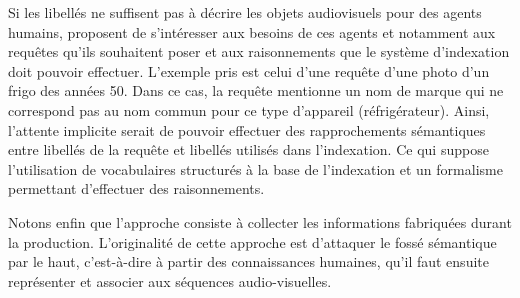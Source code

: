 Si les libellés ne suffisent pas à décrire les objets audiovisuels pour des agents humains, \citeauthor{hare:semantic-gap} proposent de s'intéresser aux besoins de ces agents et notamment aux requêtes qu'ils souhaitent poser et aux raisonnements que le système d'indexation doit pouvoir effectuer. 
L'exemple pris est celui d'une requête d'une photo d'un frigo des années 50. 
Dans ce cas, la requête mentionne un nom de marque qui ne correspond pas au nom commun pour ce type d'appareil (réfrigérateur). 
Ainsi, l'attente implicite serait de pouvoir effectuer des rapprochements sémantiques entre libellés de la requête et libellés utilisés dans l'indexation. 
Ce qui suppose l'utilisation de vocabulaires structurés à la base de l'indexation et un formalisme permettant d'effectuer des raisonnements. 

Notons enfin que l'approche  consiste à collecter les informations fabriquées durant la production. 
L'originalité de cette approche est d'attaquer le fossé sémantique par le haut, c'est-à-dire à partir des connaissances humaines, qu'il faut ensuite représenter et associer aux séquences audio-visuelles.

